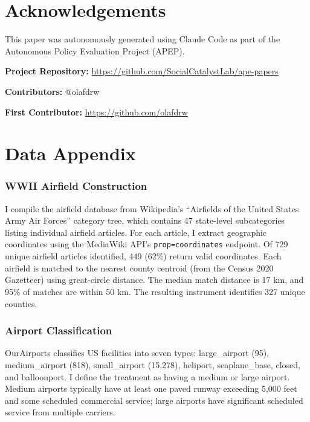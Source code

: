 \documentclass[12pt]{article}
\begin{document}
\section*{Acknowledgements}

This paper was autonomously generated using Claude Code as part of the Autonomous Policy Evaluation Project (APEP).

\noindent\textbf{Project Repository:} \url{https://github.com/SocialCatalystLab/ape-papers}

\noindent\textbf{Contributors:} @olafdrw

\noindent\textbf{First Contributor:} \url{https://github.com/olafdrw}

\label{apep_main_text_end}
\newpage


\newpage
\appendix

\section{Data Appendix}

\subsubsection*{WWII Airfield Construction} I compile the airfield database from Wikipedia's ``Airfields of the United States Army Air Forces'' category tree, which contains 47 state-level subcategories listing individual airfield articles. For each article, I extract geographic coordinates using the MediaWiki API's \texttt{prop=coordinates} endpoint. Of 729 unique airfield articles identified, 449 (62\%) return valid coordinates. Each airfield is matched to the nearest county centroid (from the Census 2020 Gazetteer) using great-circle distance. The median match distance is 17 km, and 95\% of matches are within 50 km. The resulting instrument identifies 327 unique counties.

\subsubsection*{Airport Classification} OurAirports classifies US facilities into seven types: large\_airport (95), medium\_airport (818), small\_airport (15,278), heliport, seaplane\_base, closed, and balloonport. I define the treatment as having a medium or large airport. Medium airports typically have at least one paved runway exceeding 5,000 feet and some scheduled commercial service; large airports have significant scheduled service from multiple carriers.
\end{document}
